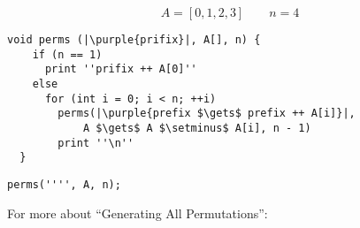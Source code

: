 \begin{frame}{}
  \[
    A = [0,1,2,3] \qquad n = 4
  \]
\end{frame}

\begin{frame}[fragile]{}
  \begin{lstlisting}[style = Cstyle]
  void perms (|\purple{prifix}|, A[], n) {
    if (n == 1)
      print ''prifix ++ A[0]''
    else 
      for (int i = 0; i < n; ++i)
        perms(|\purple{prefix $\gets$ prefix ++ A[i]}|, 
            A $\gets$ A $\setminus$ A[i], n - 1)
        print ''\n''
  }
  \end{lstlisting}

  \pause
  \begin{lstlisting}[style = Cstyle]
  perms('''', A, n);
  \end{lstlisting}
\end{frame}

\begin{frame}{}
  \centerline{\Large For more about ``Generating All Permutations'':}

  \vspace{0.30cm}
  \begin{columns}
  \end{columns}
\end{frame}

